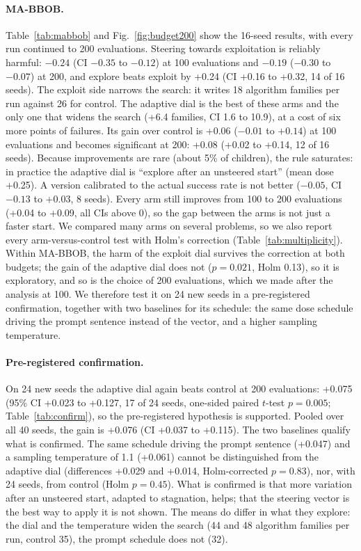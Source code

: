 \paragraph{MA-BBOB\@.}
Table~\ref{tab:mabbob} and Fig.~\ref{fig:budget200} show the 16-seed
results, with every run continued to 200 evaluations. Steering towards
exploitation is reliably harmful: $-0.24$ \aocc (CI $-0.35$ to $-0.12$)
at 100 evaluations and $-0.19$ ($-0.30$ to $-0.07$) at 200, and explore
beats exploit by +0.24 (CI +0.16 to +0.32, 14 of 16 seeds). The
exploit side narrows the search: it writes 18 algorithm families per run
against 26 for control. The adaptive dial is the best of these arms and
the only one that widens the search (+6.4 families, CI 1.6 to 10.9), at a cost
of six more points of failures. Its gain over control is +0.06 ($-0.01$
to $+0.14$) at 100 evaluations and becomes significant at 200: +0.08
(+0.02 to +0.14, 12 of 16 seeds). Because improvements are rare (about
5\% of children), the rule saturates: in practice the adaptive dial is
``explore after an unsteered start'' (mean dose +0.25). A version
calibrated to the actual success rate is not better ($-0.05$, CI $-0.13$
to $+0.03$, 8 seeds). Every arm still improves from 100 to 200
evaluations (+0.04 to +0.09, all CIs above 0), so the gap between the
arms is not just a faster start. We compared many arms on several
problems, so we also report every arm-versus-control test with Holm's
correction (Table~\ref{tab:multiplicity}). Within MA-BBOB, the harm of
the exploit dial survives the correction at both budgets; the gain of
the adaptive dial does not ($p=0.021$, Holm 0.13), so it is
exploratory, and so is the choice of 200 evaluations, which we made
after the analysis at 100. We therefore test it on 24 new seeds in a
pre-registered confirmation, together with two baselines for its
schedule: the same dose schedule driving the prompt sentence instead of
the vector, and a higher sampling temperature.

\paragraph{Pre-registered confirmation.}
On 24 new seeds the adaptive dial again beats control at 200
evaluations: +0.075 \aocc (95\% CI +0.023 to +0.127, 17 of 24 seeds,
one-sided paired $t$-test $p=0.005$; Table~\ref{tab:confirm}), so the
pre-registered hypothesis is supported. Pooled over all 40 seeds, the
gain is +0.076 (CI +0.037 to +0.115). The two baselines qualify what is
confirmed. The same schedule driving the prompt sentence (+0.047) and a
sampling temperature of 1.1 (+0.061) cannot be distinguished from the
adaptive dial (differences +0.029 and +0.014, Holm-corrected $p=0.83$),
nor, with 24 seeds, from control (Holm $p=0.45$). What is confirmed is
that more variation after an unsteered start, adapted to stagnation,
helps; that the steering vector is the best way to apply it is not
shown. The means do differ in what they explore: the dial and the
temperature widen the search (44 and 48 algorithm families per run,
control 35), the prompt schedule does not (32).

